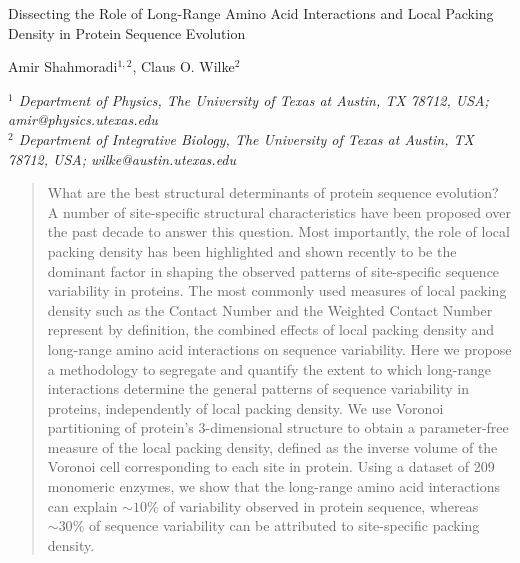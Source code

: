 \documentclass[11pt]{article}
\makeatletter
\newcommand\pubnumber{}
\newcommand\pubdate{\today}
\def\affiliation{$^1$ Department of Physics, The University of Texas at Austin, TX 78712, USA; amir@physics.utexas.edu \\
                 $^2$ Department of Integrative Biology, The University of Texas at Austin, TX 78712, USA; wilke@austin.utexas.edu
                 }
\def\Title#1{\begin{center} {\Large #1 } \end{center}}
\def\Author#1{\begin{center}{ \sc #1} \end{center}}
\def\Address#1{\begin{center}{ \it #1} \end{center}}
\newcommand\pubblock{\rightline{\begin{tabular}{l} \pubnumber\\
         \pubdate  \end{tabular}}}
\newenvironment{Abstract}{\begin{quotation}  }{\end{quotation}}
\makeatother
\begin{document}
\begin{titlepage}
\pubblock

\vfill
\Title{Dissecting the Role of Long-Range Amino Acid Interactions and Local Packing Density in Protein Sequence Evolution}
\vfill
\Author{Amir Shahmoradi$^{1,2}$, Claus O. Wilke$^2$}
\Address{\affiliation}
\vfill
\begin{Abstract}

    What are the best structural determinants of protein sequence evolution? A number of site-specific structural characteristics have been proposed over the past decade to answer this question. Most importantly, the role of local packing density has been highlighted and shown recently to be the dominant factor in shaping the observed patterns of site-specific sequence variability in proteins. The most commonly used measures of local packing density such as the Contact Number and the Weighted Contact Number represent by definition, the combined effects of local packing density and long-range amino acid interactions on sequence variability. Here we propose a methodology to segregate and quantify the extent to which long-range interactions determine the general patterns of sequence variability in proteins, independently of local packing density. We use Voronoi partitioning of protein's 3-dimensional structure to obtain a parameter-free measure of the local packing density, defined as the inverse volume of the Voronoi cell corresponding to each site in protein. Using a dataset of 209 monomeric enzymes, we show that the long-range amino acid interactions can explain $\sim10\%$ of variability observed in protein sequence, whereas $\sim30\%$ of sequence variability can be attributed to site-specific packing density.


\end{Abstract}
\end{titlepage}
\end{document}
